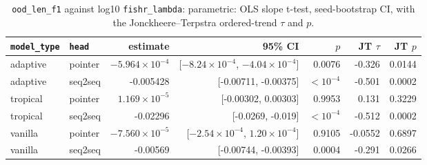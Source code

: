 \documentclass[10pt]{article}
\begin{document}
{\small
\begin{longtable}{llrrrrr}
\caption{\texttt{ood\_len\_f1} against log10 \texttt{fishr\_lambda}: parametric: OLS slope t-test, seed-bootstrap CI, with the Jonckheere--Terpstra ordered-trend $\tau$ and $p$.}\label{tab:trend-ood_len_f1}\\
\toprule
\texttt{model\_type} & \texttt{head} & estimate & 95\% CI & $p$ & JT $\tau$ & JT $p$\\
\midrule
\endhead
adaptive & pointer & $-5.964\times10^{-4}$ & [$-8.24\times10^{-4}$, $-4.04\times10^{-4}$] & 0.0076 & -0.326 & 0.0144\\
adaptive & seq2seq & -0.005428 & [-0.00711, -0.00375] & $<10^{-4}$ & -0.501 & 0.0002\\
tropical & pointer & $1.169\times10^{-5}$ & [-0.00302, 0.00303] & 0.9953 & 0.131 & 0.3229\\
tropical & seq2seq & -0.02296 & [-0.0269, -0.019] & $<10^{-4}$ & -0.512 & 0.0002\\
vanilla & pointer & $-7.560\times10^{-5}$ & [$-2.54\times10^{-4}$, $1.20\times10^{-4}$] & 0.9105 & -0.0552 & 0.6897\\
vanilla & seq2seq & -0.00569 & [-0.00744, -0.00393] & 0.0004 & -0.291 & 0.0266\\
\bottomrule
\end{longtable}
}
\end{document}
